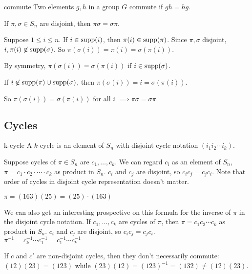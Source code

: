 \begin{defn}{commute}
Two elements $g,h$ in a group $G$ commute if $gh=hg$.
\end{defn}

\begin{lemma}
If $\pi,\sigma\in S_n$ are disjoint, then $\pi\sigma = \sigma\pi$.
\end{lemma}

\begin{pf}
Suppose $1\le i \le n$. If $i\in\operatorname{supp}(i)$, then $\pi(i)\in\operatorname{supp}(\pi)$. Since $\pi,\sigma$ disjoint, $i,\pi(i)\not\in\operatorname{supp}(\sigma)$. So $\pi(\sigma(i))=\pi(i)=\sigma(\pi(i))$.

By symmetry, $\pi(\sigma(i))=\sigma(\pi(i))$ if $i\in\operatorname{supp}(\sigma)$.

If $i\not\in\operatorname{supp}(\pi)\cup \operatorname{supp}(\sigma)$, then $\pi(\sigma(i))=i=\sigma(\pi(i))$. 

So $\pi(\sigma(i))=\sigma(\pi(i))$ for all $i$ $\implies\pi\sigma = \sigma\pi$.
\end{pf}

\subsection{Cycles}
\begin{defn}{k-cycle}
A $k$-cycle is an element of $S_n$ with disjoint cycle notation $(i_1i_2\cdots i_k)$.
\end{defn}

Suppose cycles of $\pi\in S_n$ are $c_1,\ldots,c_k$. We can regard $c_i$ as an element of $S_n$, $\pi=c_1\cdot c_2\cdot \cdots \cdot c_k$ as product in $S_n$. $c_i$ and $c_j$ are disjoint, so $c_ic_j=c_jc_i$. Note that order of cycles in disjoint cycle representation doesn't matter.

\begin{ex}
$\pi = (163)(25)=(25)\cdot (163)$
\end{ex}

We can also get an interesting prospective on this formula for the inverse of $\pi$ in the disjoint cycle notation. If $c_1,\ldots,c_k$ are cycles of $\pi$, then $\pi=c_1 c_2\cdots c_k$ as product in $S_n$. $c_i$ and $c_j$ are disjoint, so $c_ic_j=c_jc_i$. \\
$\pi^{-1}=c_k^{-1}\cdots c_1^{-1} = c_1^{-1}\cdots c_k^{-1}$

\begin{ex}
If $c$ and $c'$ are non-disjoint cycles, then they don't necessarily commute:
\\
$(12)(23)=(123)$ while $(23)(12)=(123)^{-1}=(132)\ne (12)(23)$.
\end{ex}


